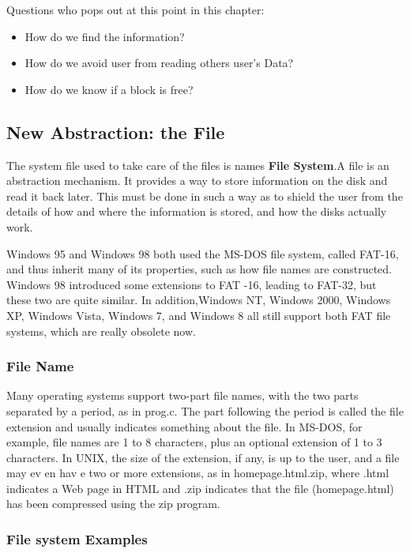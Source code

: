 Questions who pops out at this point in this chapter: 
\begin{itemize}
    \item How do we find the information?
    \item How do we avoid user from reading others user's Data?
    \item How do we know if a block is free?
\end{itemize}

\subsection{New Abstraction: the File}%
The system file used to take care of the files is names \textbf{File System}.A file is an abstraction mechanism. It provides a way to store information on the disk and read it back later. This must be done in such a way as to shield the user from the details of how and where the information is stored, and how the disks actually work.

Windows 95 and Windows 98 both used the MS-DOS file system, called FAT-16, and thus inherit many of its properties, such as how file names are constructed. Windows 98 introduced some extensions to FAT -16, leading to FAT-32, but these two are quite similar. In addition,Windows NT, Windows 2000, Windows XP, Windows Vista, Windows 7, and Windows 8 all still support both FAT file systems, which are really obsolete now.
\subsubsection{File Name}                                                %

Many operating systems support two-part file names, with the two parts separated by a period, as in prog.c. The part following the period is called the file extension and usually indicates something about the file. In MS-DOS, for example, file names are 1 to 8 characters, plus an optional extension of 1 to 3 characters. In UNIX, the size of the extension, if any, is up to the user, and a file may ev en hav e two or more extensions, as in homepage.html.zip, where .html indicates a Web page in HTML and .zip indicates that the file (homepage.html) has been compressed using the zip program.


\subsubsection{File system Examples}                                                %

